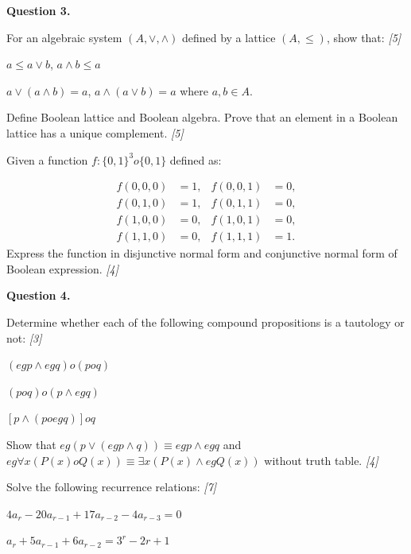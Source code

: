 \documentclass[11pt,a4paper]{article}
\newcommand{\pts}[1]{\hfill   \textit{[#1]}}
\begin{document}
\medskip


\noindent   \textbf{Question 3.}

\begin{parts}
  \item For an algebraic system $(A, \lor, \land)$ defined by a lattice $(A, \le)$, show that: \pts{5}
  
\begin{parts}
    \item $a \le a \lor b$, $a \land b \le a$
    \item $a \lor (a \land b) = a$, $a \land (a \lor b) = a$ where $a, b \in A$.
  \end{parts}
  \item Define Boolean lattice and Boolean algebra. Prove that an element in a Boolean lattice has a unique complement. \pts{5}
  \item Given a function $f: \{0, 1\}^3  o \{0, 1\}$ defined as:
  
\begin{align*}
    f(0,0,0) &= 1, & f(0,0,1) &= 0, \\
    f(0,1,0) &= 1, & f(0,1,1) &= 0, \\
    f(1,0,0) &= 0, & f(1,0,1) &= 0, \\
    f(1,1,0) &= 0, & f(1,1,1) &= 1.
  \end{align*}
  Express the function in disjunctive normal form and conjunctive normal form of Boolean expression. \pts{4}
\end{parts}

\medskip


\noindent   \textbf{Question 4.}

\begin{parts}
  \item Determine whether each of the following compound propositions is a tautology or not: \pts{3}
  
\begin{parts}
    \item $(
eg p \land 
eg q)  o (p  o q)$
    \item $(p  o q)  o (p \land 
eg q)$
    \item $[p \land (p  o 
eg q)]  o q$
  \end{parts}
  \item Show that $
eg (p \lor (
eg p \land q)) \equiv 
eg p \land 
eg q$ and $
eg \forall x (P(x)  o Q(x)) \equiv \exists x (P(x) \land 
eg Q(x))$ without truth table. \pts{4}
  \item Solve the following recurrence relations: \pts{7}
  
\begin{parts}
    \item $4 a_r - 20 a_{r-1} + 17 a_{r-2} - 4 a_{r-3} = 0$
    \item $a_r + 5 a_{r-1} + 6 a_{r-2} = 3^r - 2r + 1$
  \end{parts}
\end{parts}
\end{document}
